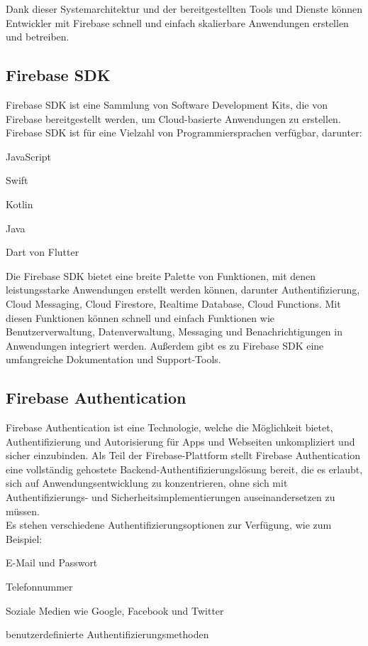 Dank dieser Systemarchitektur und der bereitgestellten Tools und Dienste können Entwickler mit Firebase schnell und einfach skalierbare Anwendungen erstellen und betreiben.

\subsection{Firebase SDK}
Firebase SDK ist eine Sammlung von Software Development Kits, die von Firebase bereitgestellt werden, um Cloud-basierte Anwendungen zu erstellen.
Firebase SDK ist für eine Vielzahl von Programmiersprachen verfügbar, darunter:
\begin{compactitem}
    \item JavaScript
    \item Swift
    \item Kotlin
    \item Java
    \item Dart von Flutter
\end{compactitem}
Die Firebase SDK bietet eine breite Palette von Funktionen, mit denen leistungsstarke Anwendungen erstellt werden können, darunter Authentifizierung, Cloud Messaging, Cloud Firestore, Realtime Database, Cloud Functions. Mit diesen Funktionen können schnell und einfach Funktionen wie Benutzerverwaltung, Datenverwaltung, Messaging und Benachrichtigungen in Anwendungen integriert werden. Außerdem gibt es zu Firebase SDK eine umfangreiche Dokumentation und Support-Tools.


\subsection{Firebase Authentication}
\author{Sandin Habibovic}

Firebase Authentication ist eine Technologie, welche die Möglichkeit bietet, Authentifizierung und Autorisierung für Apps und Webseiten unkompliziert und sicher einzubinden. Als Teil der Firebase-Plattform stellt Firebase Authentication eine vollständig gehostete Backend-Authentifizierungslösung bereit, die es erlaubt, sich auf Anwendungsentwicklung zu konzentrieren, ohne sich mit Authentifizierungs- und Sicherheitsimplementierungen auseinandersetzen zu müssen.
\\
Es stehen verschiedene Authentifizierungsoptionen zur Verfügung, wie zum Beispiel:
\begin{compactitem}
    \item E-Mail und Passwort
    \item Telefonnummer
    \item Soziale Medien wie Google, Facebook und Twitter
    \item benutzerdefinierte Authentifizierungsmethoden
\end{compactitem}

